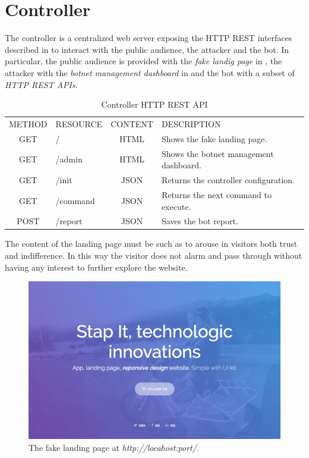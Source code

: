 \section{Controller}
\label{sec:controller}

The controller is a centralized web server exposing the HTTP REST interfaces  described in  to interact with the public audience, the attacker and the bot.
In particular, the public audience is provided with the \textit{fake landig page} in , the attacker with the  \textit{botnet management dashboard} in  and the bot with a subset of \textit{HTTP REST APIs}.

\begin{table}%
\caption{Controller HTTP REST API}
\label{tab:controller-rest}
\begin{minipage}{\columnwidth}
\begin{center}
\begin{tabular}{clcl}
  \toprule
  METHOD & RESOURCE & CONTENT & DESCRIPTION \\
  GET    & /        & HTML    & Shows the fake landing page. \\
  GET    & /admin   & HTML    & Shows the botnet management dashboard. \\
  GET    & /init    & JSON    & Returns the controller configuration.   \\
  GET    & /command & JSON    & Returns the next command to execute. \\
  POST   & /report  & JSON    & Saves the bot report. \\
  \bottomrule
\end{tabular}
\end{center}
\end{minipage}
\end{table}

The content of the landing page must be such as to arouse in visitors both trust and indifference. In this way the visitor does not alarm and pass through without having any interest to further explore the website.

\begin{figure}[tp]
  \centering
  \includegraphics[scale=0.32]{./fig/landing.png}
  \caption{The fake landing page at \textit{http://locahost:port/}.}
    \label{fig:controller-fake-landingpage}
\end{figure}

